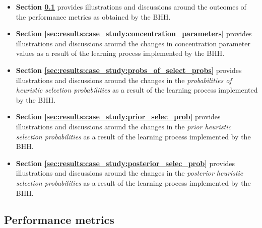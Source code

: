 \begin{itemize}
	\item \textbf{Section \ref{sec:results:case_study:performance_metrics}} provides illustrations and discussions around the outcomes of the performance metrics as obtained by the \acs{BHH}.

	\item \textbf{Section \ref{sec:results:case_study:concentration_parameters}} provides illustrations and discussions around the changes in concentration parameter values as a result of the learning process implemented by the \acs{BHH}.

	\item \textbf{Section \ref{sec:results:case_study:probs_of_select_probs}} provides illustrations and discussions around the changes in the \textit{probabilities of heuristic selection probabilities} as a result of the learning process implemented by the \acs{BHH}.

	\item \textbf{Section \ref{sec:results:case_study:prior_selec_prob}} provides illustrations and discussions around the changes in the \textit{prior heuristic selection probabilities} as a result of the learning process implemented by the \acs{BHH}.

	\item \textbf{Section \ref{sec:results:case_study:posterior_selec_prob}} provides illustrations and discussions around the changes in the \textit{posterior heuristic selection probabilities} as a result of the learning process implemented by the \acs{BHH}.


\end{itemize}

\subsection{Performance metrics}\label{sec:results:case_study:performance_metrics}

